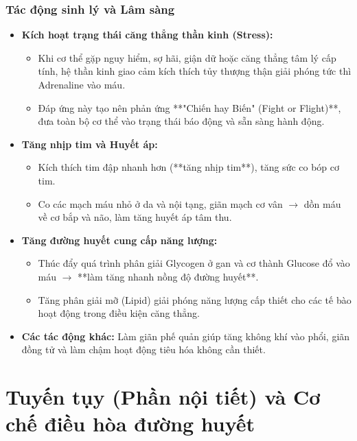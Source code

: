 \subsubsection{Tác động sinh lý và Lâm sàng}
\begin{itemize}
    \item \textbf{Kích hoạt trạng thái căng thẳng thần kinh (Stress):} 
    \begin{itemize}
        \item Khi cơ thể gặp nguy hiểm, sợ hãi, giận dữ hoặc căng thẳng tâm lý cấp tính, hệ thần kinh giao cảm kích thích tủy thượng thận giải phóng tức thì Adrenaline vào máu.
        \item Đáp ứng này tạo nên phản ứng **"Chiến hay Biến" (Fight or Flight)**, đưa toàn bộ cơ thể vào trạng thái báo động và sẵn sàng hành động.
    \end{itemize}

    \item \textbf{Tăng nhịp tim và Huyết áp:} 
    \begin{itemize}
        \item Kích thích tim đập nhanh hơn (**tăng nhịp tim**), tăng sức co bóp cơ tim.
        \item Co các mạch máu nhỏ ở da và nội tạng, giãn mạch cơ vân $\rightarrow$ dồn máu về cơ bắp và não, làm tăng huyết áp tâm thu.
    \end{itemize}

    \item \textbf{Tăng đường huyết cung cấp năng lượng:} 
    \begin{itemize}
        \item Thúc đẩy quá trình phân giải Glycogen ở gan và cơ thành Glucose đổ vào máu $\rightarrow$ **làm tăng nhanh nồng độ đường huyết**.
        \item Tăng phân giải mỡ (Lipid) giải phóng năng lượng cấp thiết cho các tế bào hoạt động trong điều kiện căng thẳng.
    \end{itemize}

    \item \textbf{Các tác động khác:} Làm giãn phế quản giúp tăng không khí vào phổi, giãn đồng tử và làm chậm hoạt động tiêu hóa không cần thiết.
\end{itemize}


\section{Tuyến tụy (Phần nội tiết) và Cơ chế điều hòa đường huyết}

